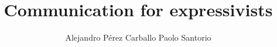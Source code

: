 \documentclass[12pt,article,oneside]{memoir}
\title{Communication for expressivists}
\author{Alejandro P\'erez Carballo \amper Paolo Santorio}
\begin{document}
	\maketitle
	
\noindent
\end{document}
